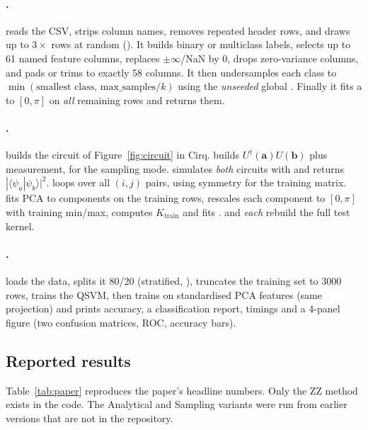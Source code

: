 \paragraph{.}  reads the CSV, strips column names, removes
repeated header rows, and draws up to $3\times$ rows at random
(). It builds binary or multiclass labels, selects up to 61 named feature
columns, replaces $\pm\infty$/NaN by 0, drops zero-variance columns, and pads or trims to exactly 58
columns. It then undersamples each class to $\min(\text{smallest class},\,\text{max\_samples}/k)$
using the \emph{unseeded} global . Finally it fits a  to $[0,\pi]$
on \emph{all} remaining rows and returns them.

\paragraph{.}  builds the circuit of
Figure~\ref{fig:circuit} in Cirq.  builds $U^\dagger(\bm a)U(\bm b)$
plus measurement, for the sampling mode.  simulates
\emph{both} circuits with  and returns $|\langle\psi_a|\psi_b\rangle|^2$.
 loops over all $(i,j)$ pairs, using symmetry for the training
matrix.  fits PCA to  components on the training rows, rescales
each component to $[0,\pi]$ with training min/max, computes $K_{\text{train}}$ and fits
.  and
 \emph{each} rebuild the full test kernel.

\paragraph{.}  loads the data, splits it 80/20 (stratified,
), truncates the training set to 3000 rows, trains the QSVM, then trains
 on standardised PCA features (same projection) and
prints accuracy, a classification report, timings and a 4-panel figure (two confusion matrices,
ROC, accuracy bars).

\subsection{Reported results}
Table~\ref{tab:paper} reproduces the paper's headline numbers. Only the ZZ method exists in the
code. The Analytical and Sampling variants were run from earlier versions that are not in the
repository.

